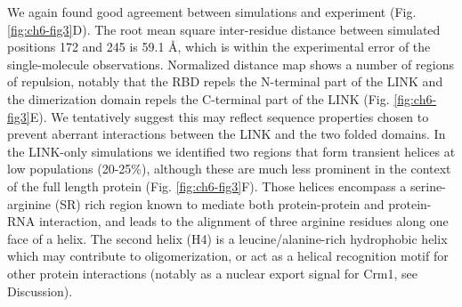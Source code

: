 \documentclass[../main.tex]{subfiles}
\begin{document}
        We again found good agreement between simulations and experiment (Fig. \ref{fig:ch6-fig3}D). The root mean square inter-residue distance between simulated positions 172 and 245 is 59.1 \AA{}, which is within the experimental error of the single-molecule observations. Normalized distance map shows a number of regions of repulsion, notably that the RBD repels the N-terminal part of the LINK and the dimerization domain repels the C-terminal part of the LINK (Fig. \ref{fig:ch6-fig3}E). We tentatively suggest this may reflect sequence properties chosen to prevent aberrant interactions between the LINK and the two folded domains. In the LINK-only simulations we identified two regions that form transient helices at low populations (20-25\%), although these are much less prominent in the context of the full length protein (Fig. \ref{fig:ch6-fig3}F). Those helices encompass a serine-arginine (SR) rich region known to mediate both protein-protein and protein-RNA interaction, and leads to the alignment of three arginine residues along one face of a helix. The second helix (H4) is a leucine/alanine-rich hydrophobic helix which may contribute to oligomerization, or act as a helical recognition motif for other protein interactions (notably as a nuclear export signal for Crm1, see Discussion). 
\end{document}
